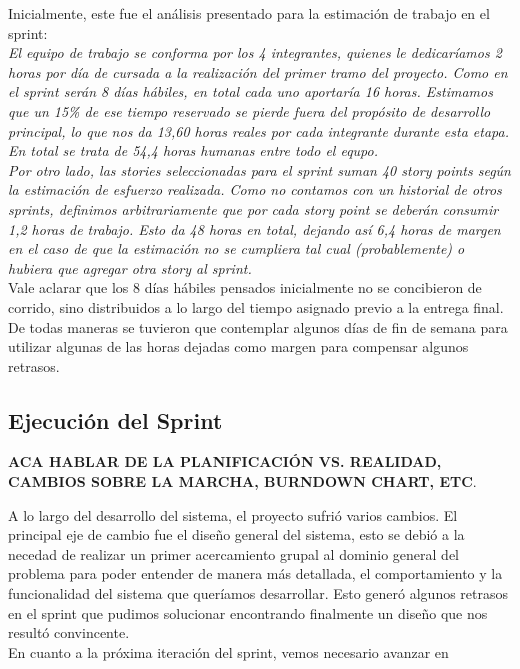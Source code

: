 Inicialmente, este fue el análisis presentado para la estimación de trabajo en el sprint:\\

\indent \textsl{El equipo de trabajo se conforma por los 4 integrantes, quienes le dedicaríamos 2 horas por día de cursada a la realización del primer tramo del proyecto. Como en el sprint serán 8 días hábiles, en total cada uno aportaría 16 horas. Estimamos que un 15\% de ese tiempo reservado se pierde fuera del propósito de desarrollo principal, lo que nos da 13,60 horas reales por cada integrante durante esta etapa. En total se trata de 54,4 horas humanas entre todo el equpo.}\\
\indent \textsl{Por otro lado, las stories seleccionadas para el sprint suman 40 story points según la estimación de esfuerzo realizada. Como no contamos con un historial de otros sprints, definimos arbitrariamente que por cada story point se deberán consumir 1,2 horas de trabajo. Esto da 48 horas en total, dejando así 6,4 horas de margen en el caso de que la estimación no se cumpliera tal cual (probablemente) o hubiera que agregar otra story al sprint.}\\

\indent Vale aclarar que los 8 días hábiles pensados inicialmente no se concibieron de corrido, sino distribuidos a lo largo del tiempo asignado previo a la entrega final. De todas maneras se tuvieron que contemplar algunos días de fin de semana para utilizar algunas de las horas dejadas como margen para compensar algunos retrasos.

\subsection{Ejecución del Sprint}

\textbf{ACA HABLAR DE LA PLANIFICACIÓN VS. REALIDAD, CAMBIOS SOBRE LA MARCHA, BURNDOWN CHART, ETC}.

A lo largo del desarrollo del sistema, el proyecto sufrió varios cambios. El principal eje de cambio fue el diseño general del sistema, esto se debió a la necedad de realizar un primer acercamiento grupal al dominio general del problema para poder entender de manera más detallada, el comportamiento y la funcionalidad del sistema que queríamos desarrollar. Esto generó algunos retrasos en el sprint que pudimos solucionar encontrando finalmente un diseño que nos resultó convincente. \\
\indent En cuanto a la próxima iteración del sprint, vemos necesario avanzar en

